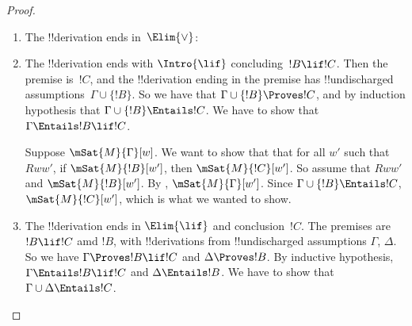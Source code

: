\documentclass[../../../include/open-logic-section]{subfiles}
\begin{document}
\begin{proof}
\begin{enumerate}
  \item The !!{derivation} ends in~$\Elim{\lor}$:

  \item The !!{derivation} ends with $\Intro{\lif}$ concluding~$!B\lif
    !C$. Then the premise is~$!C$, and the !!{derivation} ending in
    the premise has !!{undischarged} assumptions~$\Gamma \cup
    \{!B\}$. So we have that $\Gamma \cup \{!B\} \Proves !C$, and by
    induction hypothesis that $\Gamma \cup \{!B\} \Entails !C$. We
    have to show that $\Gamma \Entails !B \lif !C$.

    Suppose $\mSat{M}{\Gamma}[w]$. We want to show that that for all
    $w'$ such that $Rww'$, if $\mSat{M}{!B}[w']$, then
    $\mSat{M}{!C}[w']$. So assume that $Rww'$ and
    $\mSat{M}{!B}[w']$. By ,
    $\mSat{M}{\Gamma}[w']$. Since $\Gamma \cup \{!B\} \Entails !C$,
    $\mSat{M}{!C}[w']$, which is what we wanted to show. 

  \item The !!{derivation} ends in $\Elim{\lif}$ and
    conclusion~$!C$. The premises are $!B \lif !C$ amd $!B$, with
    !!{derivation}s from !!{undischarged} assumptions $\Gamma$,
    $\Delta$. So we have $\Gamma \Proves !B \lif !C$ and $\Delta
    \Proves !B$. By inductive hypothesis, $\Gamma \Entails !B \lif !C$
    and $\Delta \Entails !B$. We have to show that $\Gamma \cup \Delta
    \Entails !C$.


\end{enumerate}
\end{proof}
\end{document}
